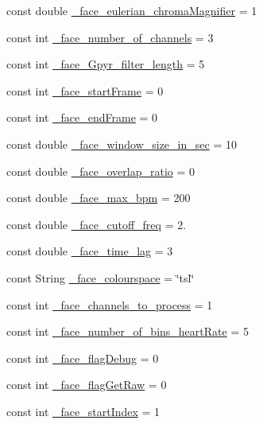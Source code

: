 \begin{DoxyCompactItemize}
\item 
const double \hyperlink{namespace_m_h_r_a5b039641e0cf1a30ba4f303e4764b4c8}{\+\_\+face\+\_\+eulerian\+\_\+chroma\+Magnifier} = 1
\item 
const int \hyperlink{namespace_m_h_r_a1af8c23e0ffae759111c964d2369a13b}{\+\_\+face\+\_\+number\+\_\+of\+\_\+channels} = 3
\item 
const int \hyperlink{namespace_m_h_r_a7eabffdab2df22a98e5aa4046d6c3baf}{\+\_\+face\+\_\+\+Gpyr\+\_\+filter\+\_\+length} = 5
\item 
const int \hyperlink{namespace_m_h_r_ac893410fca7e7a76ae562e47f8371cc1}{\+\_\+face\+\_\+start\+Frame} = 0
\item 
const int \hyperlink{namespace_m_h_r_a349e142bd15540a9d0b5b63f426fc3dc}{\+\_\+face\+\_\+end\+Frame} = 0
\item 
const double \hyperlink{namespace_m_h_r_ada7fab40b0e865f6a26751fd550b5288}{\+\_\+face\+\_\+window\+\_\+size\+\_\+in\+\_\+sec} = 10
\item 
const double \hyperlink{namespace_m_h_r_ab6430d316d9d82ce08b7d35fda6ba14e}{\+\_\+face\+\_\+overlap\+\_\+ratio} = 0
\item 
const double \hyperlink{namespace_m_h_r_a123d7bba4eba9d4c49ebe21458394a9a}{\+\_\+face\+\_\+max\+\_\+bpm} = 200
\item 
const double \hyperlink{namespace_m_h_r_afc5d67d6a0c4929f2fc30dce703740fe}{\+\_\+face\+\_\+cutoff\+\_\+freq} = 2.
\item 
const double \hyperlink{namespace_m_h_r_ad108537351ba024dfa150411983a69c4}{\+\_\+face\+\_\+time\+\_\+lag} = 3
\item 
const String \hyperlink{namespace_m_h_r_a2c3d7c5df37d2106e5f4351ebeb44c2f}{\+\_\+face\+\_\+colourspace} = \char`\"{}tsl\char`\"{}
\item 
const int \hyperlink{namespace_m_h_r_ac3a2dbcaefbcbb5814108c711ebd1fe1}{\+\_\+face\+\_\+channels\+\_\+to\+\_\+process} = 1
\item 
const int \hyperlink{namespace_m_h_r_abfcdcdfbf5694a70c871df5484e30321}{\+\_\+face\+\_\+number\+\_\+of\+\_\+bins\+\_\+heart\+Rate} = 5
\item 
const int \hyperlink{namespace_m_h_r_ade58b99d0d2023434646cb0597baafdf}{\+\_\+face\+\_\+flag\+Debug} = 0
\item 
const int \hyperlink{namespace_m_h_r_a6e9575c56ad75e4e165fd62fad98734f}{\+\_\+face\+\_\+flag\+Get\+Raw} = 0
\item 
const int \hyperlink{namespace_m_h_r_a5c705653d488611b87b11e41e4ffbfd5}{\+\_\+face\+\_\+start\+Index} = 1

\end{DoxyCompactItemize}
